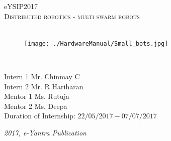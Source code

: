 \documentclass[a4paper,12pt,oneside]{book}
\begin{document}
\begin{titlepage}
	\raggedright
	{\Large eYSIP2017\\[1cm]}
	{\Huge\scshape\centering Distributed robotics - multi swarm robots \\[.1in]}
	\vfill
		\hfill\\
	\begin{figure}[h!]
		\texttt{[image: ./HardwareManual/Small\_bots.jpg]}		
	\end{figure}	
	\hfill\\
	\begin{flushright}
		{\large Intern 1 Mr. Chinmay C \\}
		{\large Intern 2 Mr. R Hariharan \\}
		{\large Mentor 1 Ms. Rutuja \\}
		{\large Mentor 2 Ms. Deepa \\}
		{\large Duration of Internship: $ 22/05/2017-07/07/2017 $ \\}
	\end{flushright}
	
	{\itshape 2017, e-Yantra Publication}
\end{titlepage}
	
\tableofcontents
\end{document}
